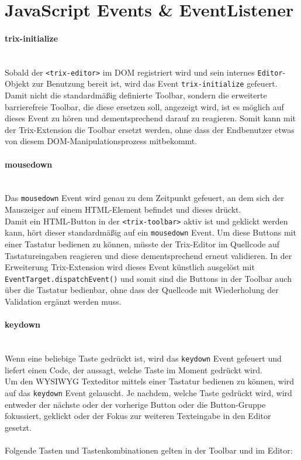 \section{JavaScript Events \& EventListener}
\paragraph{trix-initialize}\mbox{}\\
Sobald der \texttt{<trix-editor>} im DOM registriert wird und sein internes \texttt{Editor}-Objekt zur Benutzung bereit ist, wird das Event \texttt{trix-initialize} gefeuert.\\
Damit nicht die standardmäßig definierte Toolbar, sondern die erweiterte barrierefreie Toolbar, die diese ersetzen soll, angezeigt wird, ist es möglich auf dieses Event zu hören und dementsprechend darauf zu reagieren. Somit kann mit der Trix-Extension die Toolbar ersetzt werden, ohne dass der Endbenutzer etwas von diesem DOM-Manipulationsprozess mitbekommt. %

\paragraph{mousedown}\mbox{}\\
Das \texttt{mousedown} Event wird genau zu dem Zeitpunkt gefeuert, an dem sich der Mauszeiger auf einem HTML-Element befindet und dieses drückt.\\
Damit ein HTML-Button in der \texttt{<trix-toolbar>} aktiv ist und geklickt werden kann, hört dieser standardmäßig auf ein \texttt{mousedown} Event. Um diese Buttons mit einer Tastatur bedienen zu können, müsste der Trix-Editor im Quellcode auf Tastatureingaben reagieren und diese dementsprechend erneut validieren. In der Erweiterung Trix-Extension wird dieses Event künstlich ausgelöst mit \texttt{EventTarget.dispatchEvent()} und somit sind die Buttons in der Toolbar auch über die Tastatur bedienbar, ohne dass der Quellcode mit Wiederholung der Validation ergänzt werden muss.

\paragraph{keydown}\mbox{}\\
Wenn eine beliebige Taste gedrückt ist, wird das \texttt{keydown} Event gefeuert und liefert einen Code, der aussagt, welche Taste im Moment gedrückt wird.\\
Um den WYSIWYG Texteditor mittels einer Tastatur bedienen zu können, wird auf das \texttt{keydown} Event gelauscht. Je nachdem, welche Taste gedrückt wird, wird entweder der nächste oder der vorherige Button oder die Button-Gruppe fokussiert, geklickt oder der Fokus zur weiteren Texteingabe in den Editor gesetzt.\\
\\Folgende Tasten und Tastenkombinationen gelten in der Toolbar und im Editor:

